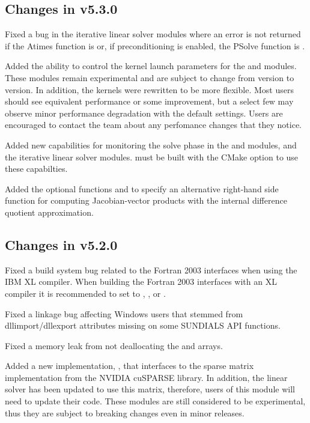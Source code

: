 \subsection*{Changes in v5.3.0}

Fixed a bug in the iterative linear solver modules where an error is not
returned if the Atimes function is  or, if preconditioning is enabled,
the PSolve function is .

Added the ability to control the {\cuda} kernel launch parameters for the
 and  modules. These modules remain
experimental and are subject to change from version to version.
In addition, the  kernels were rewritten to be more flexible.
Most users should see equivalent performance or some improvement, but a select
few may observe minor performance degradation with the default settings. Users
are encouraged to contact the {\sundials} team about any perfomance changes
that they notice.

Added new capabilities for monitoring the solve phase in the {\sunnonlinsolnewton}
and {\sunnonlinsolfixedpoint} modules, and the {\sundials} iterative linear solver
modules. {\sundials} must be built with the CMake option
 to use these capabilties.

Added the optional functions  and
 to specify an alternative right-hand side function
for computing Jacobian-vector products with the internal difference quotient
approximation.

\subsection*{Changes in v5.2.0}

Fixed a build system bug related to the Fortran 2003 interfaces when using the
IBM XL compiler. When building the Fortran 2003 interfaces with an XL compiler
it is recommended to set  to ,
, or .

Fixed a linkage bug affecting Windows users that stemmed from dllimport/dllexport
attributes missing on some SUNDIALS API functions.

Fixed a memory leak from not deallocating the  and 
arrays.

Added a new  implementation, , that interfaces
to the sparse matrix implementation from the NVIDIA cuSPARSE library. In addition,
the  linear solver has been updated to
use this matrix, therefore, users of this module will need to update their code.
These modules are still considered to be experimental, thus they are subject to
breaking changes even in minor releases.

